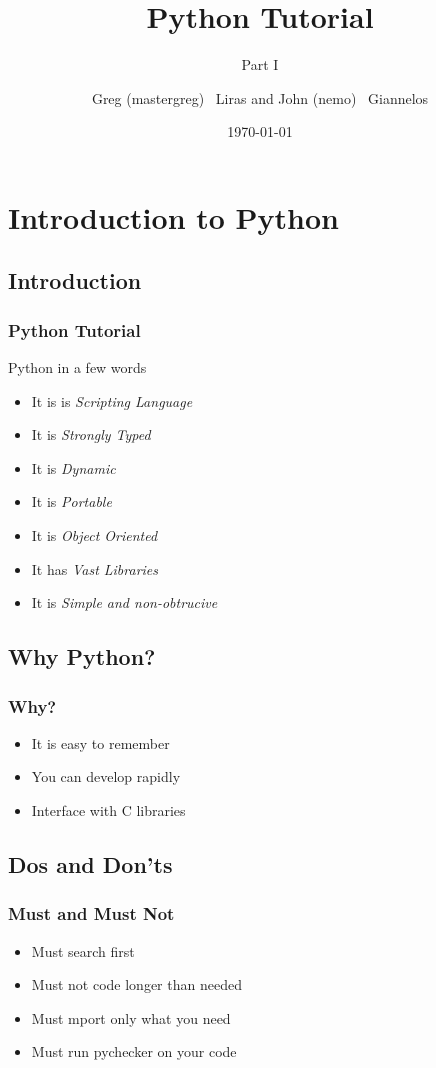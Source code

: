 \documentclass{beamer}
\author[nemo,mastergreg]{Greg (mastergreg) ~Liras and John (nemo)
~Giannelos}
\institute{foss.ntua}
\title{Python Tutorial}
\subtitle{Part I}
\date{\today}
\begin{document}
\frame{\titlepage}
\section[Intro]{}
\frame{\tableofcontents}
\section{Introduction to Python}
\subsection{Introduction}
\begin{frame}
	\frametitle{Python Tutorial}

Python in a few words
\begin{itemize}
\item<1-> It is is \emph{Scripting Language}
\item<2-> It is \emph{Strongly Typed}
\item<3-> It is \emph{Dynamic}
\item<4-> It is \emph{Portable}
\item<5-> It is \emph{Object Oriented}
\item<6-> It has \emph{Vast Libraries}
\item<7-> It is \emph{Simple and non-obtrucive}
\end{itemize}

\end{frame}

\subsection{Why Python?}
\begin{frame}
	\frametitle{Why?}
	\begin{itemize}
	\item<1-> It is easy to remember
	\item<2-> You can develop rapidly
	\item<2-> Interface with C libraries
	\end{itemize}
\end{frame}
\subsection{Dos and Don'ts}
\begin{frame}
	\frametitle{Must and Must Not}

\begin{itemize}
\item<1-> Must search first
\item<2-> Must not code longer than needed
\item<3-> Must mport only what you need
\item<4-> Must run pychecker on your code
\end{itemize}

\end{frame}
\end{document}
